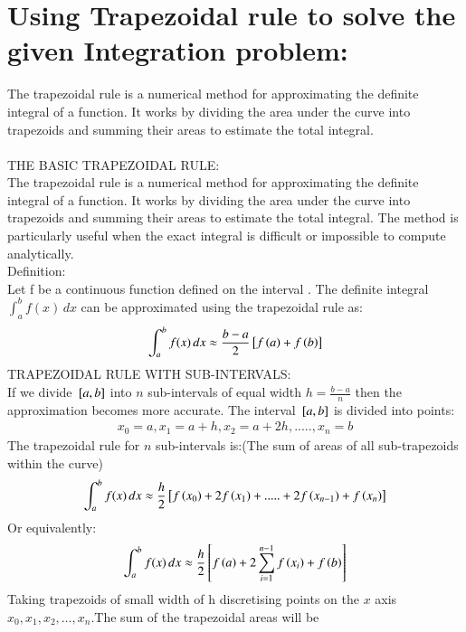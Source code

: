 \documentclass[journal]{IEEEtran}
\begin{document}
\section*{Using Trapezoidal rule to solve the given Integration problem: }
The trapezoidal rule is a numerical method for approximating the definite integral of a function. It works by dividing the area under the curve into trapezoids and summing their areas to estimate the total integral.\\\\
THE BASIC TRAPEZOIDAL RULE:\\
The trapezoidal rule is a numerical method for approximating the definite integral of a function. It works by dividing the area under the curve into trapezoids and summing their areas to estimate the total integral. The method is particularly useful when the exact integral is difficult or impossible to compute analytically.\\
Definition:\\
Let f be a continuous function defined on the interval . The definite integral $\int_a^bf(x)\,dx$ can be approximated using the trapezoidal rule as:\\
\begin{align}
\int_a^bf(x)\,dx\approx\frac{b-a}{2}{}\left[f\left(a\right)+f\left(b\right)\right]
\end{align}
TRAPEZOIDAL RULE WITH SUB-INTERVALS:\\
If we divide ${}\left[a,b\right]$ into $n$ sub-intervals of equal width $h=\frac{b-a}{n}$ then the approximation becomes more accurate. The interval ${}\left[a,b\right]$ is divided into points:\\
\begin{align}
    x_0=a,x_1=a+h,x_2=a+2h,.....,x_n=b
\end{align}
The trapezoidal rule for $n$ sub-intervals is:(The sum of areas of all sub-trapezoids within the curve)\\
\begin{align}
    \int_a^bf(x)\,dx\approx \frac{h}{2}{}\left[f\left(x_0\right)+2f\left(x_1\right)+.....+2f\left(x_{n-1}\right)+f\left(x_n\right)\right]
\end{align}
Or equivalently:\\
\begin{align}
    \int_a^bf(x)\,dx\approx \frac{h}{2}{}\left[f\left(a\right)+2\sum_{i=1}^{n-1}f\left(x_i\right)+f\left(b\right)\right]
\end{align}
Taking trapezoids of small width of h discretising points on the $x$ axis $x_0, x_1, x_2, \dots, x_n$.The sum of the trapezoidal areas will be
\end{document}
